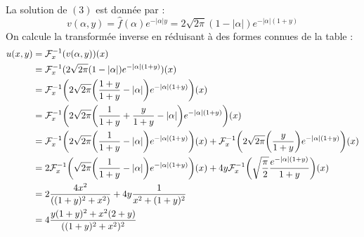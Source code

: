 La solution de $(3)$ est donnée par :
$$v(\alpha,y) = \widehat{f}(\alpha)e^{-|\alpha|y} = 2\sqrt{2\pi}(1-|\alpha|) e^{-|\alpha|(1+y)}$$
On calcule la transformée inverse en réduisant à des formes connues de la table :
\begin{align*}
    u(x,y) &= \mathcal{F}_x^{-1}(v(\alpha,y))(x) \\
    &= \mathcal{F}_x^{-1}(2\sqrt{2\pi}(1-|\alpha|) e^{-|\alpha|(1+y)})(x) \\
    &= \mathcal{F}_x^{-1} \bigg{(} 2\sqrt{2\pi} \bigg{(} \frac{1+y}{1+y} - |\alpha| \bigg{)} e^{-|\alpha|(1+y)} \bigg{)}(x) \\
    &= \mathcal{F}_x^{-1} \bigg{(} 2\sqrt{2\pi} \bigg{(} \frac{1}{1+y} + \frac{y}{1+y} - |\alpha| \bigg{)} e^{-|\alpha|(1+y)} \bigg{)}(x) \\
    &= \mathcal{F}_x^{-1} \bigg{(} 2\sqrt{2\pi} \bigg{(} \frac{1}{1+y} - |\alpha| \bigg{)} e^{-|\alpha|(1+y)} \bigg{)}(x) + \mathcal{F}_x^{-1} \bigg{(} 2\sqrt{2\pi} \bigg{(} \frac{y}{1+y}\bigg{)} e^{-|\alpha|(1+y)} \bigg{)}(x) \\
    &= 2\mathcal{F}_x^{-1} \bigg{(} \sqrt{2\pi} \bigg{(} \frac{1}{1+y} - |\alpha| \bigg{)} e^{-|\alpha|(1+y)} \bigg{)}(x) + 4y \mathcal{F}_x^{-1} \bigg{(} \sqrt{\frac{\pi}{2}} \frac{e^{-|\alpha|(1+y)}}{1+y} \bigg{)}(x) \\
    &= 2 \frac{4x^2}{((1+y)^2+x^2)} + 4y \frac{1}{x^2+(1+y)^2} \\
    &= 4 \frac{y(1+y)^2+x^2(2+y)}{((1+y)^2+x^2)^2}
\end{align*}


